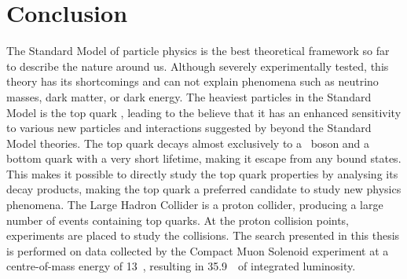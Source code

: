 \section{Conclusion}
The Standard Model of particle physics is the best theoretical framework so far to describe the nature around us. Although severely experimentally tested, this theory has its shortcomings and can not explain phenomena such as neutrino masses, dark matter, or dark energy. The heaviest particles in the Standard Model is the top quark , leading to the believe that it has an enhanced sensitivity to various new particles and interactions suggested by beyond the Standard Model theories. The top quark decays almost exclusively to a \PW\ boson and a bottom quark with a very short lifetime, making it escape from any bound states. This makes it possible to directly study the top quark properties by analysing its decay products, making the top quark a preferred candidate to study new physics phenomena. The Large Hadron Collider is a proton collider, producing a large number of events containing top quarks. At the proton collision points, experiments are placed to study the collisions. The search presented in this thesis is performed on data collected by the Compact Muon Solenoid experiment at a centre-of-mass energy of 13~\TeV, resulting in 35.9~\fbinv\ of integrated luminosity. 


